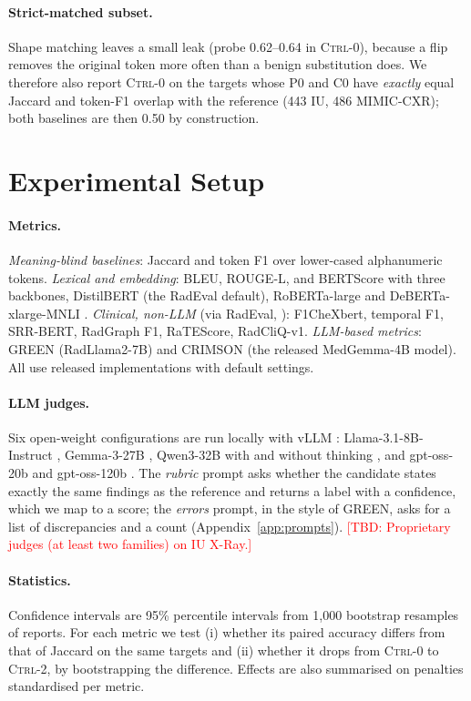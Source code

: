 \documentclass[11pt]{article}
\newcommand{\ctrlz}{\textsc{Ctrl-0}\xspace}
\newcommand{\ctrlt}{\textsc{Ctrl-2}\xspace}
\newcommand{\tbd}[1]{\textcolor{red}{[TBD: #1]}}
\begin{document}
\paragraph{Strict-matched subset.} Shape matching leaves a small leak (probe 0.62--0.64 in \ctrlz), because a flip removes the original token more often than a benign substitution does. We therefore also report \ctrlz on the targets whose P0 and C0 have \emph{exactly} equal Jaccard and token-F1 overlap with the reference (443 IU, 486 MIMIC-CXR); both baselines are then 0.50 by construction.

\section{Experimental Setup}

\paragraph{Metrics.}
\emph{Meaning-blind baselines}: Jaccard and token F1 over lower-cased alphanumeric tokens. \emph{Lexical and embedding}: BLEU, ROUGE-L, and BERTScore with three backbones, DistilBERT \citep{sanh-etal-2019-distilbert} (the RadEval default), RoBERTa-large \citep{liu-etal-2019-roberta} and DeBERTa-xlarge-MNLI \citep{he-etal-2021-deberta}. \emph{Clinical, non-LLM} (via RadEval, \citealp{xu-etal-2025-radeval}): F1CheXbert, temporal F1, SRR-BERT, RadGraph F1, RaTEScore, RadCliQ-v1. \emph{LLM-based metrics}: GREEN (RadLlama2-7B) and CRIMSON (the released MedGemma-4B model). All use released implementations with default settings.

\paragraph{LLM judges.}
Six open-weight configurations are run locally with vLLM \citep{kwon-etal-2023-vllm}: Llama-3.1-8B-Instruct \citep{llama3-2024}, Gemma-3-27B \citep{gemma3-2025}, Qwen3-32B with and without thinking \citep{qwen3-2025}, and gpt-oss-20b and gpt-oss-120b \citep{gptoss-2025}. The \emph{rubric} prompt asks whether the candidate states exactly the same findings as the reference and returns a label with a confidence, which we map to a score; the \emph{errors} prompt, in the style of GREEN, asks for a list of discrepancies and a count (Appendix~\ref{app:prompts}). \tbd{Proprietary judges (at least two families) on IU X-Ray.}

\paragraph{Statistics.}
Confidence intervals are 95\% percentile intervals from 1,000 bootstrap resamples of reports. For each metric we test (i) whether its paired accuracy differs from that of Jaccard on the same targets and (ii) whether it drops from \ctrlz to \ctrlt, by bootstrapping the difference. Effects are also summarised on penalties standardised per metric.
\end{document}
